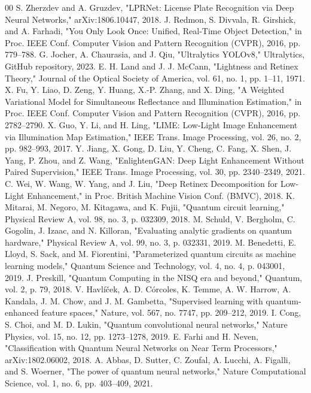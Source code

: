 \documentclass{ieeeaccess}
\begin{document}
\begin{thebibliography}{00}
 S. Zherzdev and A. Gruzdev, "LPRNet: License Plate Recognition via Deep Neural Networks," arXiv:1806.10447, 2018.
 J. Redmon, S. Divvala, R. Girshick, and A. Farhadi, "You Only Look Once: Unified, Real-Time Object Detection," in Proc. IEEE Conf. Computer Vision and Pattern Recognition (CVPR), 2016, pp. 779--788.
 G. Jocher, A. Chaurasia, and J. Qiu, "Ultralytics YOLOv8," Ultralytics, GitHub repository, 2023.
 E. H. Land and J. J. McCann, "Lightness and Retinex Theory," Journal of the Optical Society of America, vol. 61, no. 1, pp. 1--11, 1971.
 X. Fu, Y. Liao, D. Zeng, Y. Huang, X.-P. Zhang, and X. Ding, "A Weighted Variational Model for Simultaneous Reflectance and Illumination Estimation," in Proc. IEEE Conf. Computer Vision and Pattern Recognition (CVPR), 2016, pp. 2782--2790.
 X. Guo, Y. Li, and H. Ling, "LIME: Low-Light Image Enhancement via Illumination Map Estimation," IEEE Trans. Image Processing, vol. 26, no. 2, pp. 982--993, 2017.
 Y. Jiang, X. Gong, D. Liu, Y. Cheng, C. Fang, X. Shen, J. Yang, P. Zhou, and Z. Wang, "EnlightenGAN: Deep Light Enhancement Without Paired Supervision," IEEE Trans. Image Processing, vol. 30, pp. 2340--2349, 2021.
 C. Wei, W. Wang, W. Yang, and J. Liu, "Deep Retinex Decomposition for Low-Light Enhancement," in Proc. British Machine Vision Conf. (BMVC), 2018.
 K. Mitarai, M. Negoro, M. Kitagawa, and K. Fujii, "Quantum circuit learning," Physical Review A, vol. 98, no. 3, p. 032309, 2018.
 M. Schuld, V. Bergholm, C. Gogolin, J. Izaac, and N. Killoran, "Evaluating analytic gradients on quantum hardware," Physical Review A, vol. 99, no. 3, p. 032331, 2019.
 M. Benedetti, E. Lloyd, S. Sack, and M. Fiorentini, "Parameterized quantum circuits as machine learning models," Quantum Science and Technology, vol. 4, no. 4, p. 043001, 2019.
 J. Preskill, "Quantum Computing in the NISQ era and beyond," Quantum, vol. 2, p. 79, 2018.
 V. Havlíček, A. D. Córcoles, K. Temme, A. W. Harrow, A. Kandala, J. M. Chow, and J. M. Gambetta, "Supervised learning with quantum-enhanced feature spaces," Nature, vol. 567, no. 7747, pp. 209--212, 2019.
 I. Cong, S. Choi, and M. D. Lukin, "Quantum convolutional neural networks," Nature Physics, vol. 15, no. 12, pp. 1273--1278, 2019.
 E. Farhi and H. Neven, "Classification with Quantum Neural Networks on Near Term Processors," arXiv:1802.06002, 2018.
 A. Abbas, D. Sutter, C. Zoufal, A. Lucchi, A. Figalli, and S. Woerner, "The power of quantum neural networks," Nature Computational Science, vol. 1, no. 6, pp. 403--409, 2021.

\end{thebibliography}
\end{document}
